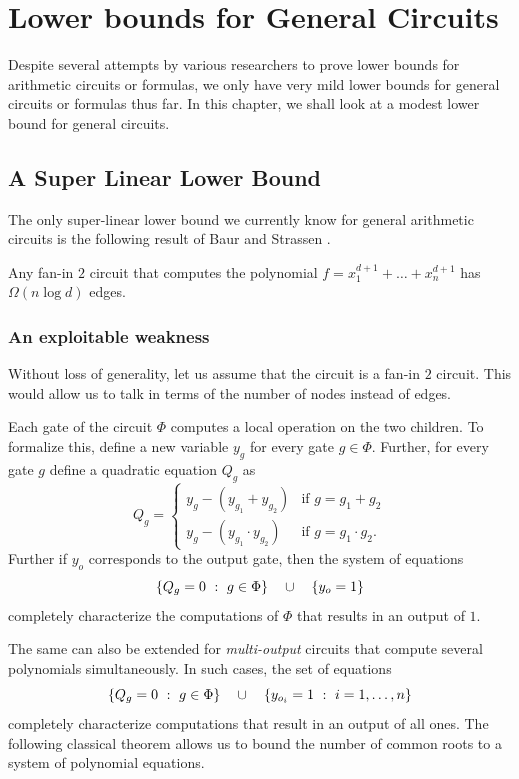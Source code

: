 \chapter{Lower bounds for General Circuits}\label{chap:gen-ckt}

Despite several attempts by various researchers to prove lower bounds for arithmetic circuits or formulas, we only have very mild lower bounds for general circuits or formulas thus far. 
In this chapter, we shall look at a modest lower bound for general circuits. 

\section{A Super Linear Lower Bound}\label{sec:baur-strassen}

The only super-linear lower bound we currently know for general arithmetic circuits is the following  result of Baur and Strassen \cite{BS83}.

\begin{theorem}[\cite{BS83}]\label{thm:baur-strassen}
  Any fan-in $2$ circuit that computes the polynomial $f = x_1^{d+1} + \dots + x_n^{d+1}$ has $\Omega(n\log d)$ edges. 
\end{theorem}


\subsection{An exploitable weakness}

Without loss of generality, let us assume that the circuit is a fan-in $2$ circuit. 
This would allow us to talk in terms of the number of nodes instead of edges. 

Each gate of the circuit $\Phi$ computes a local operation on the two children. 
To formalize this, define a new variable $y_g$ for every gate $g \in \Phi$. 
Further, for every gate $g$ define a quadratic equation $Q_g$ as
$$
Q_g = \begin{cases} y_g - (y_{g_1} + y_{g_2}) & \text{if $g = g_1 + g_2$}\\
  y_g - (y_{g_1}\cdot y_{g_2}) & \text{if $g = g_1 \cdot g_2$}.
\end{cases}
$$
Further if $y_o$  corresponds to the output gate, then the system of equations
$$\left\{{Q_g = 0}\ : \ {g\in \Phi}\right\} \quad \cup \quad \left\{y_{o} = 1\right\}$$
completely characterize the computations of $\Phi$ that results in an output of $1$. 

The same can also be extended for \emph{multi-output} circuits that compute several polynomials simultaneously. 
In such cases, the set of equations
$$\left\{{Q_g = 0}\ : \ {g\in \Phi}\right\} \quad \cup \quad \left\{{y_{o_i} = 1}\ : \ {i=1, \ldots, n}\right\}$$
completely characterize computations that result in an output of all ones. 
The following classical theorem allows us to bound the number of  common roots to a system of polynomial equations. 


